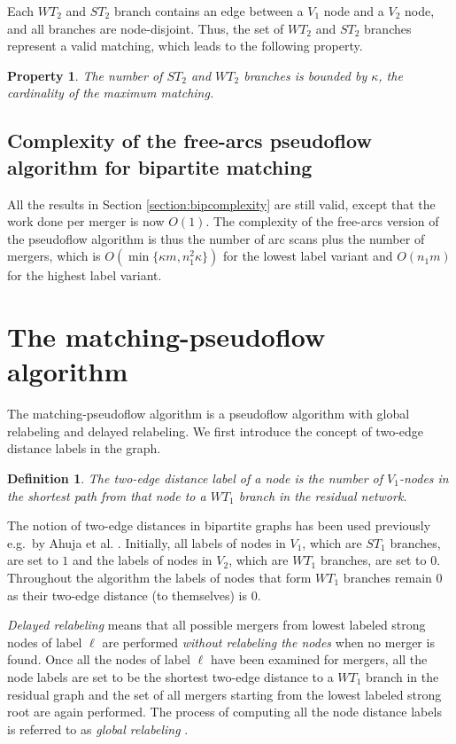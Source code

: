 \documentclass{article}
\newtheorem{property}{Property}[section]
\newtheorem{definition}{Definition}[section]
\begin{document}
Each $WT_2$ and $ST_2$ branch contains an edge between a $V_1$ node and a $V_2$ node, and all branches are node-disjoint. Thus, the set of $WT_2$ and $ST_2$ branches represent a valid matching, which leads to the following property.

\begin{property}
\label{property:branchbound}
The number of $ST_2$ and $WT_2$ branches is bounded by $\kappa$, the cardinality of the maximum matching.
\end{property}

\subsection{Complexity of the free-arcs pseudoflow algorithm for bipartite matching}

All the results in Section \ref{section:bipcomplexity} are still valid, except that the work done per merger is now $O(1)$.  The complexity of the free-arcs version of the pseudoflow algorithm is thus the number of arc scans plus the number of mergers, which is \mbox{$O(\min\{\kappa m, n_1^2 \kappa\})$} for the lowest label variant and $O(n_1 m)$ for the highest label variant.

\section{The matching-pseudoflow algorithm}
\label{section:matching-pseudoflow}

The {\sf matching-pseudoflow} algorithm is a pseudoflow algorithm with global relabeling and delayed relabeling.  We first introduce the concept of two-edge distance labels in the graph.

\begin{definition}
The {\em two-edge distance label} of a node is the number of $V_1$-nodes in the shortest path from that node to a $WT_1$ branch in the residual network.
\end{definition}
The notion of two-edge distances in bipartite graphs has been used previously e.g.\ by Ahuja et al. \cite{AhuOST94}.  Initially, all labels of nodes in $V_1$, which are $ST_1$ branches, are set to $1$ and the labels of nodes in $V_2$, which are $WT_1$ branches, are set to $0$. Throughout the algorithm the labels of nodes that form $WT_1$ branches remain $0$ as their two-edge distance (to themselves) is $0$.

{\em Delayed relabeling} means that all possible mergers from lowest labeled strong nodes of label $\ell$ are performed
{\em without relabeling the nodes} when no merger is found.  Once all the nodes of label $\ell$ have been examined for mergers, all the node labels are set to be the shortest two-edge distance to a $WT_1$ branch in the residual graph and the set of all mergers starting from the lowest labeled strong root are again performed.  The process of computing all
the node distance labels is referred to as {\em global relabeling} \cite{GolC97}.
\end{document}
